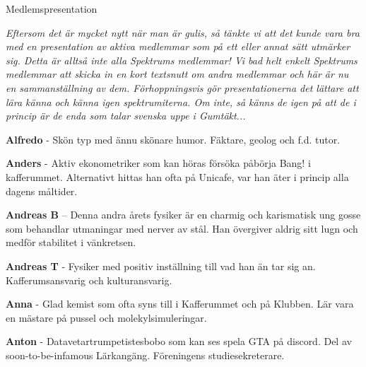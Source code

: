 \documentclass{spektraklet}
\begin{document}
\begin{artikel}{Medlemspresentation}{}

\textit{Eftersom det är mycket nytt när man är gulis, så tänkte vi att det kunde vara bra med en presentation av aktiva medlemmar som på ett eller annat sätt utmärker sig. Detta är alltså inte alla Spektrums medlemmar! Vi bad helt enkelt Spektrums medlemmar att skicka in en kort textsnutt om andra medlemmar och här är nu en sammanställning av dem. Förhoppningsvis gör presentationerna det lättare att lära känna och känna igen spektrumiterna. Om inte, så känns de igen på att de i princip är de enda som talar svenska uppe i Gumtäkt...}

\begin{twocolumns}




\textbf{Alfredo} - Skön typ med ännu skönare humor. Fäktare, geolog och f.d. tutor.

\textbf{Anders} - Aktiv ekonometriker som kan höras försöka påbörja Bang! i kafferummet. Alternativt hittas han ofta på Unicafe, var han äter i princip alla dagens måltider. %

\textbf{Andreas B} – Denna andra årets fysiker är en charmig och karismatisk ung gosse som behandlar utmaningar med nerver av stål. Han övergiver aldrig sitt lugn och medför stabilitet i vänkretsen.

\textbf{Andreas T} - Fysiker med positiv inställning till vad han än tar sig an. Kafferumsansvarig och kulturansvarig.

\textbf{Anna} - Glad kemist som ofta syns till i Kafferummet och på Klubben. Lär vara en mästare på pussel och molekylsimuleringar.

\textbf{Anton} - Datavetartrumpetistesbobo som kan ses spela GTA på discord. Del av soon-to-be-infamous Lärkangäng. Föreningens studiesekreterare.


\end{twocolumns}
\end{artikel}
\end{document}
